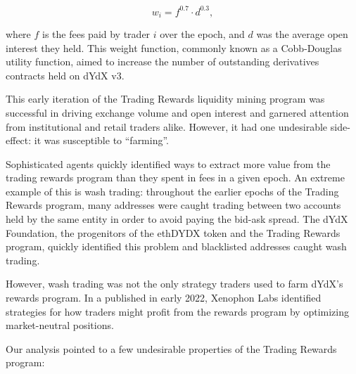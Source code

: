         \begin{equation}
            w_i = f^{0.7} \cdot d^{0.3},
        \end{equation}

        where $f$ is the fees paid by trader $i$ over the epoch, and $d$ was the average open interest they held. This weight function, commonly known as a Cobb-Douglas utility function, aimed to increase the number of outstanding derivatives contracts held on dYdX v3. 

        This early iteration of the Trading Rewards liquidity mining program was successful in driving exchange volume and open interest and garnered attention from institutional and retail traders alike. However, it had one undesirable side-effect: it was susceptible to ``farming''. 
        
        Sophisticated agents quickly identified ways to extract more value from the trading rewards program than they spent in fees in a given epoch. An extreme example of this is wash trading: throughout the earlier epochs of the Trading Rewards program, many addresses were caught trading between two accounts held by the same entity in order to avoid paying the bid-ask spread. The dYdX Foundation, the progenitors of the ethDYDX token and the Trading Rewards program, quickly identified this problem and blacklisted addresses caught wash trading.

        However, wash trading was not the only strategy traders used to farm dYdX's rewards program. In a  published in early 2022, Xenophon Labs identified strategies for how traders might profit from the rewards program by optimizing market-neutral positions. 
        
        Our analysis pointed to a few undesirable properties of the Trading Rewards program:

